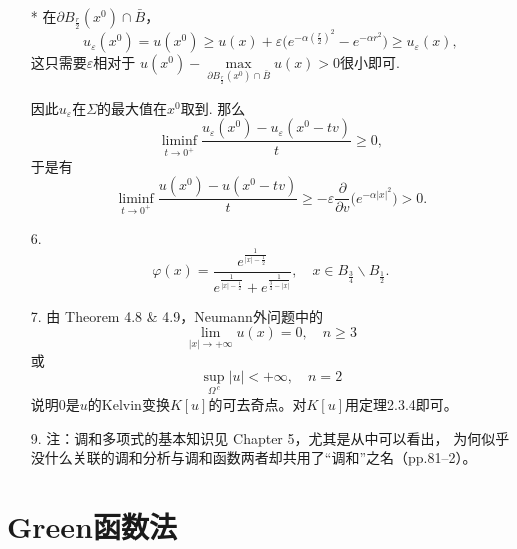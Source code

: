 \begin{itemize}
    * 在$\partial B_\frac{r}{2}(x^0)\cap\bar{B}$，
    \[u_\varepsilon(x^0)=u(x^0)\geqslant
    u(x)+\varepsilon\big(e^{-\alpha(\frac{r}{2})^2}-e^{-\alpha r^2}\big)
    \geqslant u_\varepsilon(x),\]
    这只需要$\varepsilon$相对于
    $u(x^0)-\max\limits_{\partial B_\frac{r}{2}(x^0)\cap\bar{B}}u(x)>0$很小即可.

因此$u_\varepsilon$在$\varSigma$的最大值在$x^0$取到. 那么
$$\liminf_{t\rightarrow0^+}\frac{u_\varepsilon(x^0)-u_\varepsilon(x^0-tv)}{t}\geqslant0,$$
于是有
$$\liminf_{t\rightarrow0^+}\frac{u(x^0)-u(x^0-tv)}{t}
\geqslant-\varepsilon\frac{\partial}{\partial v}\big(e^{-\alpha|x|^2}\big)>0.$$

\item[6.]
$$\varphi(x)=\frac{e^\frac{1}{|x|-\frac{1}{2}}}
{e^\frac{1}{|x|-\frac{1}{2}}+e^\frac{1}{\frac{3}{4}-|x|}},
\quad x\in B_\frac{3}{4}\backslash B_\frac{1}{2}.$$

\item[7.] 由\cite{Ax} Theorem 4.8 \& 4.9，Neumann外问题中的
\[\lim_{|x|\to+\infty}u(x)=0, \quad n\geqslant3\]
或
\[\sup_{\varOmega^{\,c}}|u|<+\infty, \quad n=2\]
说明$0$是$u$的Kelvin变换$K[u]$的可去奇点。对$K[u]$用定理2.3.4即可。

\item[9.] 注：调和多项式的基本知识见\cite{Ax} Chapter 5，尤其是从中可以看出，
为何似乎没什么关联的调和分析与调和函数两者却共用了``调和''之名（pp.81--2）。
\end{itemize}

\section{Green函数法}


